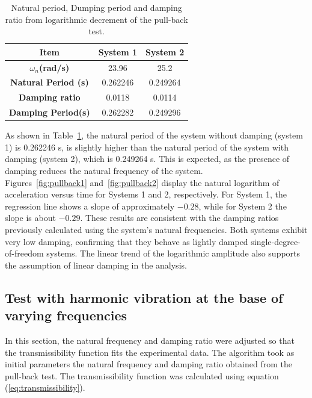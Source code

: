 \documentclass{article}  %
\begin{document}
\newpage

\begin{table}[h]
\centering
  \begin{tabular}{|c|c|c|}
  \hline
  \textbf{Item}& \textbf{System 1}& \textbf{System 2} \\ \hline
  \textbf{$\omega_n$(rad/s)} & 23.96 & 25.2  \\ \hline
  \textbf{Natural Period (s)} & 0.262246& 0.249264  \\ \hline
  \textbf{Damping ratio} & 0.0118&0.0114  \\ \hline
  \textbf{Damping Period(s)} & 0.262282&0.249296  \\ \hline
  \end{tabular}
\caption{Natural period, Dumping period and damping ratio from logarithmic decrement of the pull-back test.}
\label{tab:pullback}
\end{table}

As shown in Table~\ref{tab:pullback}, the natural period of the system without damping (system 1) is 0.262246 s, is slightly higher than the natural period of the system with damping (system 2), which is 0.249264 s. This is expected, as the presence of damping reduces the natural frequency of the system.\\

Figures~\ref{fig:pullback1} and~\ref{fig:pullback2} display the natural logarithm of acceleration versus time for Systems 1 and 2, respectively. For System 1, the regression line shows a slope of approximately $-0.28$, while for System 2 the slope is about $-0.29$. These results are consistent with the damping ratios previously calculated using the system's natural frequencies. Both systems exhibit very low damping, confirming that they behave as lightly damped single-degree-of-freedom systems. The linear trend of the logarithmic amplitude also supports the assumption of linear damping in the analysis.

\subsection{Test with harmonic vibration at the base of varying frequencies}

In this section, the natural frequency and damping ratio were adjusted so that the transmissibility function  fits the experimental data. The algorithm took as initial parameters the natural frequency and damping ratio obtained from the pull-back test. The transmissibility function was calculated using equation (\ref{eq:transmissibility}).
\end{document}
